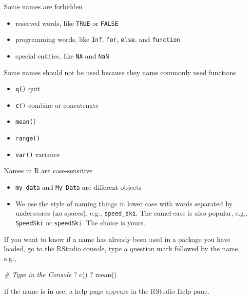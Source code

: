 \documentclass[
]{book}
\newenvironment{Shaded}{\begin{snugshade}}{\end{snugshade}}
\newcommand{\AttributeTok}[1]{\textcolor[rgb]{0.77,0.63,0.00}{#1}}
\newcommand{\CommentTok}[1]{\textcolor[rgb]{0.56,0.35,0.01}{\textit{#1}}}
\newcommand{\StringTok}[1]{\textcolor[rgb]{0.31,0.60,0.02}{#1}}
\providecommand{\tightlist}{%
  \setlength{\itemsep}{0pt}\setlength{\parskip}{0pt}}
\begin{document}
Some names are forbidden

\begin{itemize}
\tightlist
\item
  reserved words, like \texttt{TRUE} or \texttt{FALSE}\\
\item
  programming words, like \texttt{Inf}, \texttt{for}, \texttt{else}, and \texttt{function}\\
\item
  special entities, like \texttt{NA} and \texttt{NaN}
\end{itemize}

Some names should not be used because they name commonly used functions

\begin{itemize}
\tightlist
\item
  \texttt{q()} quit
\item
  \texttt{c()} combine or concatenate
\item
  \texttt{mean()}
\item
  \texttt{range()}
\item
  \texttt{var()} variance
\end{itemize}

Names in R are case-sensitive

\begin{itemize}
\tightlist
\item
  \texttt{my\_data} and \texttt{My\_Data} are different objects
\item
  We use the style of naming things in lower case with words separated by underscores (no spaces), e.g., \texttt{speed\_ski}. The camel-case is also popular, e.g., \texttt{SpeedSki} or \texttt{speedSki}. The choice is yours.
\end{itemize}

If you want to know if a name has already been used in a package you have loaded, go to the RStudio console, type a question mark followed by the name, e.g.,

\begin{Shaded}
\begin{Highlighting}[]
\CommentTok{\# Type in the Console}
\StringTok{\textasciigrave{}}\AttributeTok{? c()}\StringTok{\textasciigrave{}} 
\StringTok{\textasciigrave{}}\AttributeTok{? mean()}\StringTok{\textasciigrave{}}
\end{Highlighting}
\end{Shaded}

If the name is in use, a help page appears in the RStudio Help pane.
\end{document}
